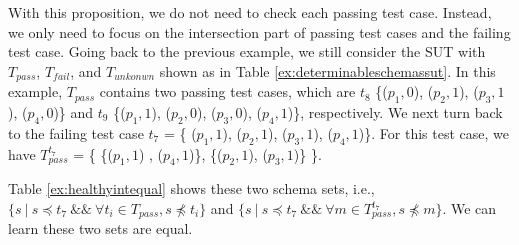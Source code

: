 With this proposition, we do not need to check each passing test case. Instead, we only need to focus on the intersection part of passing test cases and the failing test case.  Going back to the previous example,  we still consider the SUT with $T_{pass}$, $T_{fail}$, and $T_{unkonwn}$ shown as in Table \ref{ex:determinableschemassut}. In this example, $T_{pass}$ contains two passing test cases, which are  $t_{8}$ \{($p_{1}, 0$), ($p_{2}, 1$), ($p_{3}, 1$), ($p_{4}, 0$)\} and  $t_{9}$  \{($p_{1}, 1$), ($p_{2}, 0$), ($p_{3}, 0$), ($p_{4}, 1$)\}, respectively. We next turn back to the failing test case $t_{7}$ =  \{ ($p_{1}, 1$), ($p_{2}, 1$), ($p_{3}, 1$), ($p_{4}, 1$)\}. For this test case, we have $T_{pass}^{t_{7}}$ = \{ \{($p_{1}, 1$) , ($p_{4}, 1$)\}, \{($p_{2}, 1$), ($p_{3}, 1$)\} \}.


Table \ref{ex:healthyintequal} shows these two schema sets, i.e., $\{ s\ |\ s \preceq t_{7}\ \&\&\  \forall t_{i} \in T_{pass}, s \npreceq t_{i} \} $ and $\{ s\ |\ s \preceq t_{7}\ \&\&\ \forall m \in T_{pass}^{t_{7}}, s \npreceq m \}$. We can learn these two sets are equal.

